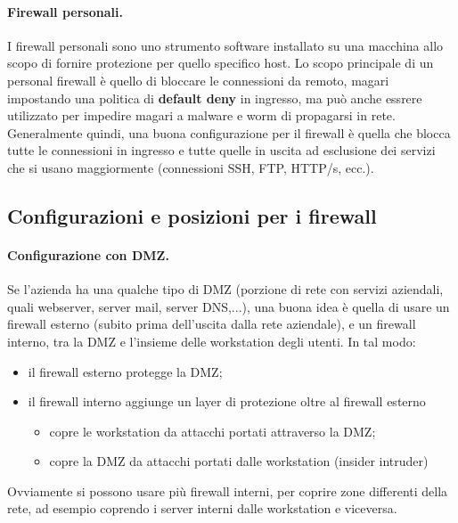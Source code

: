 \documentclass[a4paper, 10pt, twoside]{article}
\begin{document}
	\paragraph{Firewall personali.} I firewall personali sono uno strumento software installato su una macchina allo scopo di fornire protezione per quello specifico host. 
	Lo scopo principale di un personal firewall è quello di bloccare le connessioni da remoto, magari impostando una politica di \textbf{default deny} in ingresso, ma può anche essrere utilizzato per impedire magari a malware e worm di propagarsi in rete. Generalmente quindi, una buona configurazione per il firewall è quella che blocca tutte le connessioni in ingresso e tutte quelle in uscita ad esclusione dei servizi che si usano maggiormente (connessioni SSH, FTP, HTTP/s, ecc.).

	\subsection{Configurazioni e posizioni per i firewall}
	\paragraph{Configurazione con DMZ.} Se l'azienda ha una qualche tipo di DMZ (porzione di rete con servizi aziendali, quali webserver, server mail, server DNS,...), una buona idea è quella di usare un firewall esterno (subito prima dell'uscita dalla rete aziendale), e un firewall interno, tra la DMZ e l'insieme delle workstation degli utenti. In tal modo: \begin{itemize}
		\item il firewall esterno protegge la DMZ;
		\item il firewall interno aggiunge un layer di protezione oltre al firewall esterno \begin{itemize}
			\item copre le workstation da attacchi portati attraverso la DMZ;
			\item copre la DMZ da attacchi portati dalle workstation (insider intruder)
		\end{itemize}
	\end{itemize}

	Ovviamente si possono usare più firewall interni, per coprire zone differenti della rete, ad esempio coprendo i server interni dalle workstation e viceversa.
\end{document}

